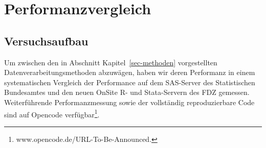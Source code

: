 \documentclass[
  german,
  10pt,
  twoside]{article}
\let\oldref\ref
\renewcommand{\ref}[1]{\oldref{#1}\raisebox{-0.2ex}{\scriptsize\color{wistaBlue}\ding{247}}}
\begin{document}
\begin{table}

\caption{\label{tbl-pkg-versions}Versionen verfügbarer R-Packages}


\end{table}%

\section{Performanzvergleich}\label{sec-performance}

\subsection{Versuchsaufbau}\label{versuchsaufbau}

Um zwischen den in Abschnitt Kapitel~\ref{sec-methoden} vorgestellten
Datenverarbeitungsmethoden abzuwägen, haben wir deren Performanz in
einem systematischen Vergleich der Performance auf dem SAS-Server des
Statistischen Bundesamtes und den neuen OnSite R- und Stata-Servern des
FDZ gemessen. Weiterführende Performanzmessung sowie der vollständig
reproduzierbare Code sind auf Opencode verfügbar\footnote{www.opencode.de/URL-To-Be-Announced.}.
\end{document}
